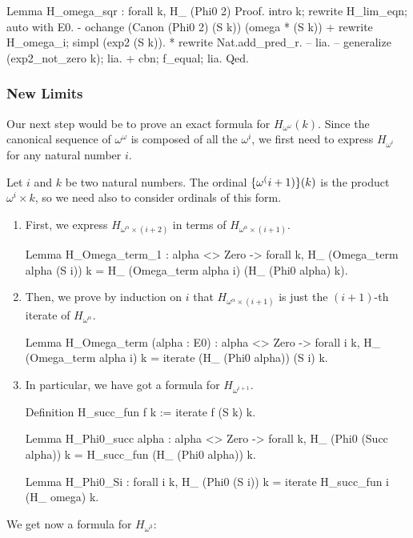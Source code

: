 \begin{Coqsrc}

Lemma H_omega_sqr : forall k,
    H_ (Phi0  2)%
Proof.
  intro k; 
   rewrite H_lim_eqn; auto with E0.
  - ochange (Canon (Phi0 2) (S k)) (omega * (S k))%
    +  rewrite H_omega_i; simpl (exp2 (S k)).
       *  rewrite Nat.add_pred_r.
          -- lia. 
          --   generalize (exp2_not_zero k);  lia.
    + cbn; f_equal; lia.
Qed.
\end{Coqsrc}

\subsubsection{New Limits}

Our next step would be to prove an exact formula for $H_{\omega^\omega}(k)$.
Since the canonical sequence of $\omega^\omega$ is composed of all the
$\omega^i$, we first need to express $H_{\omega^i}$ for any natural number $i$.

Let $i$ and $k$ be two natural numbers. 
The ordinal $\mbox{$\{\omega^(i+1)\}(k)$}$ is the product
$\omega^i \times k$, so we need also to consider ordinals of this form.

\begin{enumerate}
\item First,  we express $H_{\omega^\alpha \times (i+2)}$ in terms of
$H_{\omega^\alpha \times (i+1)}$.

\begin{Coqsrc}
Lemma H_Omega_term_1 : alpha <> Zero -> forall  k,  
    H_ (Omega_term alpha (S i)) k =
    H_ (Omega_term alpha i) (H_ (Phi0 alpha) k).
\end{Coqsrc}

\item
Then, we prove by induction on $i$ that $H_{\omega^\alpha \times (i+1)}$ is just the
$(i+1)$-th iterate of $H_{\omega^\alpha}$.


\begin{Coqsrc}
Lemma H_Omega_term (alpha : E0)  :
alpha <> Zero -> forall i k, 
  H_ (Omega_term alpha i) k = iterate  (H_ (Phi0 alpha)) (S i) k.
\end{Coqsrc}

\item In particular, we have got a formula for $H_{\omega^{i+1}}$.

\begin{Coqsrc}
Definition H_succ_fun f k := iterate f (S k) k.

Lemma H_Phi0_succ alpha  : alpha <> Zero -> forall k,
      H_ (Phi0 (Succ alpha)) k = H_succ_fun (H_ (Phi0 alpha)) k. 

Lemma H_Phi0_Si : forall i k,
      H_ (Phi0 (S i)) k = iterate H_succ_fun i (H_ omega) k. 
\end{Coqsrc}

\end{enumerate}
We get now a  formula for $H_{\omega^3}$:

